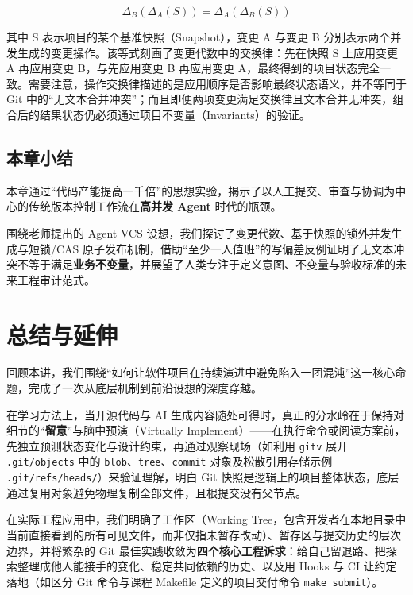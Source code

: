 \documentclass[UTF8,a4paper,11pt,fontset=fandol]{ctexart}
\begin{document}
\[
\Delta_B(\Delta_A(S)) = \Delta_A(\Delta_B(S))
\]

其中 S 表示项目的某个基准快照（Snapshot），变更 A 与变更 B 分别表示两个并发生成的变更操作。该等式刻画了变更代数中的交换律：先在快照 S 上应用变更 A 再应用变更 B，与先应用变更 B 再应用变更 A，最终得到的项目状态完全一致。需要注意，操作交换律描述的是应用顺序是否影响最终状态语义，并不等同于 Git 中的“无文本合并冲突”；而且即便两项变更满足交换律且文本合并无冲突，组合后的结果状态仍必须通过项目不变量（Invariants）的验证。

\subsection{本章小结}

本章通过“代码产能提高一千倍”的思想实验，揭示了以人工提交、审查与协调为中心的传统版本控制工作流在\textbf{高并发 Agent} 时代的瓶颈。

围绕老师提出的 Agent VCS 设想，我们探讨了变更代数、基于快照的锁外并发生成与短锁/CAS 原子发布机制，借助“至少一人值班”的写偏差反例证明了无文本冲突不等于满足\textbf{业务不变量}，并展望了人类专注于定义意图、不变量与验收标准的未来工程审计范式。

\section{总结与延伸}

回顾本讲，我们围绕“如何让软件项目在持续演进中避免陷入一团混沌”这一核心命题，完成了一次从底层机制到前沿设想的深度穿越。

在学习方法上，当开源代码与 AI 生成内容随处可得时，真正的分水岭在于保持对细节的“\textbf{留意}”与脑中预演（Virtually Implement）——在执行命令或阅读方案前，先独立预测状态变化与设计约束，再通过观察现场（如利用 \texttt{gitv} 展开 \texttt{.git/objects} 中的 \texttt{blob}、\texttt{tree}、\texttt{commit} 对象及松散引用存储示例 \texttt{.git/refs/heads/}）来验证理解，明白 Git 快照是逻辑上的项目整体状态，底层通过复用对象避免物理复制全部文件，且根提交没有父节点。



在实际工程应用中，我们明确了工作区（Working Tree，包含开发者在本地目录中当前直接看到的所有可见文件，而非仅指未暂存改动）、暂存区与提交历史的层次边界，并将繁杂的 Git 最佳实践收敛为\textbf{四个核心工程诉求}：给自己留退路、把探索整理成他人能接手的变化、稳定共同依赖的历史、以及用 Hooks 与 CI 让约定落地（如区分 Git 命令与课程 Makefile 定义的项目交付命令 \texttt{make submit}）。
\end{document}
